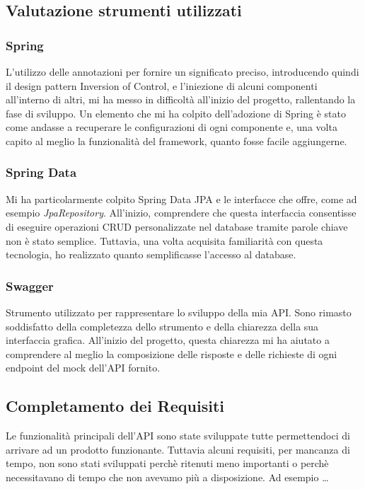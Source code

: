 \subsection{Valutazione strumenti utilizzati}
\subsubsection*{Spring}
L'utilizzo delle annotazioni per fornire un significato preciso, introducendo quindi il design pattern Inversion of Control, e l'iniezione di alcuni componenti all'interno di altri, mi ha messo in difficoltà all'inizio del progetto, rallentando la fase di sviluppo.
Un elemento che mi ha colpito dell'adozione di Spring è stato come andasse a recuperare le configurazioni di ogni componente e, una volta capito al meglio la funzionalità del framework, quanto fosse facile aggiungerne.

\subsubsection*{Spring Data}
Mi ha particolarmente colpito Spring Data JPA e le interfacce che offre, come ad esempio \textit{JpaRepository}. All'inizio, comprendere che questa interfaccia consentisse di eseguire operazioni CRUD personalizzate nel database tramite parole chiave non è stato semplice. Tuttavia, una volta acquisita familiarità con questa tecnologia, ho realizzato quanto semplificasse l'accesso al database.

\subsubsection*{Swagger}
Strumento utilizzato per rappresentare lo sviluppo della mia API. Sono rimasto soddisfatto della completezza dello strumento e della chiarezza della sua interfaccia grafica. All'inizio del progetto, questa chiarezza mi ha aiutato a comprendere al meglio la composizione delle risposte e delle richieste di ogni endpoint del mock dell'API fornito.

\subsection{Completamento dei Requisiti}
Le funzionalità principali dell’API sono state sviluppate tutte permettendoci di arrivare ad un prodotto funzionante. Tuttavia alcuni requisiti, per mancanza di tempo, non sono stati sviluppati perchè ritenuti meno importanti o perchè necessitavano di tempo che non avevamo più a disposizione. Ad esempio …


